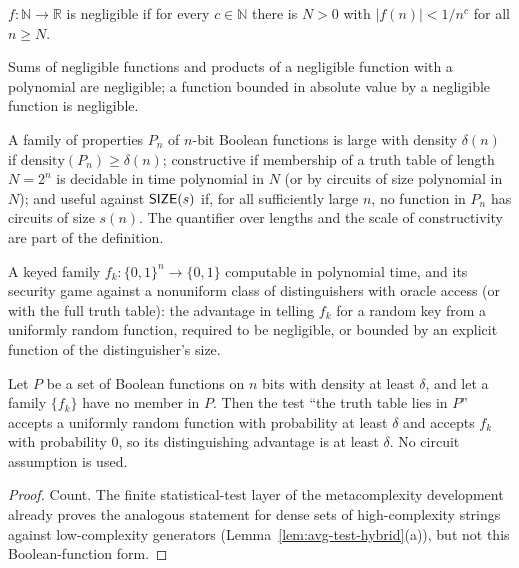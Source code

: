 \begin{definition}
  \label{def:barriers-negligible}
  \leanok
  $f : \mathbb{N} \to \mathbb{R}$ is negligible if for every $c \in \mathbb{N}$
  there is $N > 0$ with $|f(n)| < 1 / n^c$ for all $n \ge N$.
\end{definition}

\begin{lemma}
  \label{lem:barriers-negligible-closure}
  Sums of negligible functions and products of a negligible function with a
  polynomial are negligible; a function bounded in absolute value by a
  negligible function is negligible.
\end{lemma}

\begin{definition}
  \label{def:barriers-natural-property}
  A family of properties $P_n$ of $n$-bit Boolean functions is large with
  density $\delta(n)$ if $\mathrm{density}(P_n) \ge \delta(n)$; constructive if
  membership of a truth table of length $N = 2^n$ is decidable in time
  polynomial in $N$ (or by circuits of size polynomial in $N$); and useful
  against $\mathsf{SIZE}(s)$ if, for all sufficiently large $n$, no function in
  $P_n$ has circuits of size $s(n)$. The quantifier over lengths and the scale
  of constructivity are part of the definition.
\end{definition}

\begin{definition}
  \label{def:barriers-prf}
  A keyed family $f_k : \{0,1\}^n \to \{0,1\}$ computable in polynomial time,
  and its security game against a nonuniform class of distinguishers with oracle
  access (or with the full truth table): the advantage in telling $f_k$ for a
  random key from a uniformly random function, required to be negligible, or
  bounded by an explicit function of the distinguisher's size.
\end{definition}

\begin{lemma}
  \label{lem:barriers-range-distinguisher}
  Let $P$ be a set of Boolean functions on $n$ bits with density at least
  $\delta$, and let a family $\{f_k\}$ have no member in $P$. Then the test
  ``the truth table lies in $P$'' accepts a uniformly random function with
  probability at least $\delta$ and accepts $f_k$ with probability $0$, so its
  distinguishing advantage is at least $\delta$. No circuit assumption is used.
\end{lemma}
\begin{proof}
  Count. The finite statistical-test layer of the metacomplexity development
  already proves the analogous statement for dense sets of high-complexity
  strings against low-complexity generators
  (Lemma~\ref{lem:avg-test-hybrid}(a)), but not this Boolean-function form.
\end{proof}

